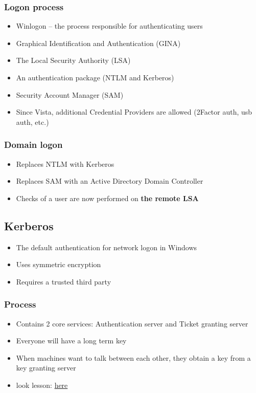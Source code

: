 \documentclass{article}
\begin{document}
\subsubsection{Logon process}
\begin{itemize}
  \item Winlogon – the process responsible for authenticating users 
  \item Graphical Identification and Authentication (GINA) 
  \item The Local Security Authority (LSA) 
  \item An authentication package (NTLM and Kerberos) 
  \item Security Account Manager (SAM) 
  \item Since Vista, additional Credential Providers are allowed (2Factor auth, usb auth, etc.)
\end{itemize}

\subsubsection{Domain logon}
\begin{itemize}
  \item Replaces NTLM with Kerberos 
  \item Replaces SAM with an Active Directory Domain Controller 
  \item Checks of a user are now performed on \textbf{the remote LSA}
\end{itemize}

\subsection{Kerberos}
\begin{itemize}
  \item The default authentication for network logon in Windows 
  \item Uses symmetric encryption
  \item Requires a trusted third party
\end{itemize}

\subsubsection{Process}
\begin{itemize}
  \item Contains 2 core services: Authentication server and Ticket granting server
  \item Everyone will have a long term key
  \item When machines want to talk between each other, they obtain a key from a key granting server
  \item look lesson: \href{https://echo360.org.uk/lesson/db83e544-8e6f-4cbe-93d7-c7b6fc92d131/classroom#sortDirection=desc}{here}
\end{itemize}
\end{document}
